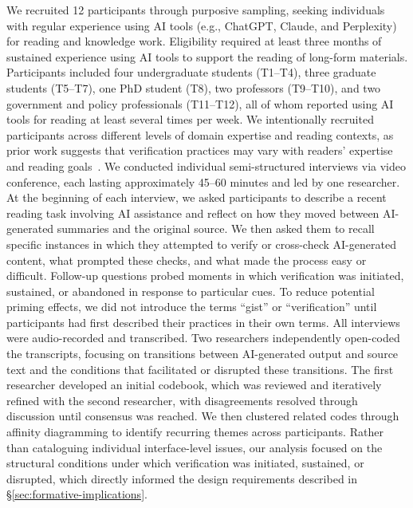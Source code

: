 \documentclass[manuscript,review,anonymous]{acmart}
\begin{document}
We recruited 12 participants through purposive sampling, seeking individuals with regular experience using AI tools (e.g., ChatGPT, Claude, and Perplexity) for reading and knowledge work. Eligibility required at least three months of sustained experience using AI tools to support the reading of long-form materials. Participants included four undergraduate students (T1--T4), three graduate students (T5--T7), one PhD student (T8), two professors (T9--T10), and two government and policy professionals (T11--T12), all of whom reported using AI tools for reading at least several times per week. We intentionally recruited participants across different levels of domain expertise and reading contexts, as prior work suggests that verification practices may vary with readers' expertise and reading goals~\cite{papertrail,supporting_or_hindering_chi26}. We conducted individual semi-structured interviews via video conference, each lasting approximately 45--60 minutes and led by one researcher. At the beginning of each interview, we asked participants to describe a recent reading task involving AI assistance and reflect on how they moved between AI-generated summaries and the original source. We then asked them to recall specific instances in which they attempted to verify or cross-check AI-generated content, what prompted these checks, and what made the process easy or difficult. Follow-up questions probed moments in which verification was initiated, sustained, or abandoned in response to particular cues. To reduce potential priming effects, we did not introduce the terms ``gist'' or ``verification'' until participants had first described their practices in their own terms. All interviews were audio-recorded and transcribed. Two researchers independently open-coded the transcripts, focusing on transitions between AI-generated output and source text and the conditions that facilitated or disrupted these transitions. The first researcher developed an initial codebook, which was reviewed and iteratively refined with the second researcher, with disagreements resolved through discussion until consensus was reached. We then clustered related codes through affinity diagramming to identify recurring themes across participants. Rather than cataloguing individual interface-level issues, our analysis focused on the structural conditions under which verification was initiated, sustained, or disrupted, which directly informed the design requirements described in §\ref{sec:formative-implications}.

\end{document}
